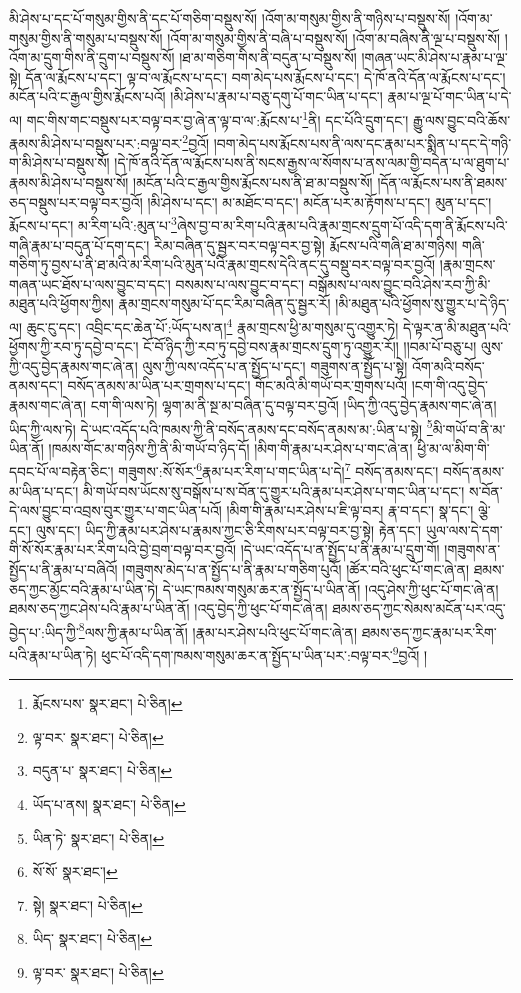 མི་ཤེས་པ་དང་པོ་གསུམ་གྱིས་ནི་དང་པོ་གཅིག་བསྡུས་སོ། །འོག་མ་གསུམ་གྱིས་ནི་གཉིས་པ་བསྡུས་སོ། །འོག་མ་གསུམ་གྱིས་ནི་གསུམ་པ་བསྡུས་སོ། །འོག་མ་གསུམ་གྱིས་ནི་བཞི་པ་བསྡུས་སོ། །འོག་མ་བཞིས་ནི་ལྔ་པ་བསྡུས་སོ། །འོག་མ་དྲུག་གིས་ནི་དྲུག་པ་བསྡུས་སོ། །ཐ་མ་གཅིག་གིས་ནི་བདུན་པ་བསྡུས་སོ། །གཞན་ཡང་མི་ཤེས་པ་རྣམ་པ་ལྔ་སྟེ། དོན་ལ་རྨོངས་པ་དང་། ལྟ་བ་ལ་རྨོངས་པ་དང་། བག་མེད་པས་རྨོངས་པ་དང་། དེ་ཁོ་ནའི་དོན་ལ་རྨོངས་པ་དང་། མངོན་པའི་ང་རྒྱལ་གྱིས་རྨོངས་པའོ། །མི་ཤེས་པ་རྣམ་པ་བཅུ་དགུ་པོ་གང་ཡིན་པ་དང་། རྣམ་པ་ལྔ་པོ་གང་ཡིན་པ་དེ་ལ། གང་གིས་གང་བསྡུས་པར་བལྟ་བར་བྱ་ཞེ་ན་ལྟ་བ་ལ་:རྨོངས་པ་\footnote{རྨོངས་པས་  སྣར་ཐང་།  པེ་ཅིན། }ནི། དང་པོའི་དྲུག་དང་། རྒྱུ་ལས་བྱུང་བའི་ཆོས་རྣམས་མི་ཤེས་པ་བསྡུས་པར་:བལྟ་བར་\footnote{ལྟ་བར་  སྣར་ཐང་།  པེ་ཅིན། }བྱའོ། །བག་མེད་པས་རྨོངས་པས་ནི་ལས་དང་རྣམ་པར་སྨིན་པ་དང་དེ་གཉི་ག་མི་ཤེས་པ་བསྡུས་སོ། །དེ་ཁོ་ནའི་དོན་ལ་རྨོངས་པས་ནི་སངས་རྒྱས་ལ་སོགས་པ་ནས་ལམ་གྱི་བདེན་པ་ལ་ཐུག་པ་རྣམས་མི་ཤེས་པ་བསྡུས་སོ། །མངོན་པའི་ང་རྒྱལ་གྱིས་རྨོངས་པས་ནི་ཐ་མ་བསྡུས་སོ། །དོན་ལ་རྨོངས་པས་ནི་ཐམས་ཅད་བསྡུས་པར་བལྟ་བར་བྱའོ། །མི་ཤེས་པ་དང་། མ་མཐོང་བ་དང་། མངོན་པར་མ་རྟོགས་པ་དང་། མུན་པ་དང་། རྨོངས་པ་དང་། མ་རིག་པའི་:མུན་པ་\footnote{བདུན་པ་  སྣར་ཐང་།  པེ་ཅིན། }ཞེས་བྱ་བ་མ་རིག་པའི་རྣམ་པའི་རྣམ་གྲངས་དྲུག་པོ་འདི་དག་ནི་རྨོངས་པའི་གཞི་རྣམ་པ་བདུན་པོ་དག་དང་། རིམ་བཞིན་དུ་སྦྱར་བར་བལྟ་བར་བྱ་སྟེ། རྨོངས་པའི་གཞི་ཐ་མ་གཉིས། གཞི་གཅིག་ཏུ་བྱས་པ་ནི་ཐ་མའི་མ་རིག་པའི་མུན་པའི་རྣམ་གྲངས་དེའི་ནང་དུ་བསྡུ་བར་བལྟ་བར་བྱའོ། །རྣམ་གྲངས་གཞན་ཡང་ཐོས་པ་ལས་བྱུང་བ་དང་། བསམས་པ་ལས་བྱུང་བ་དང་། བསྒོམས་པ་ལས་བྱུང་བའི་ཤེས་རབ་ཀྱི་མི་མཐུན་པའི་ཕྱོགས་ཀྱིས། རྣམ་གྲངས་གསུམ་པོ་དང་རིམ་བཞིན་དུ་སྦྱར་རོ། །མི་མཐུན་པའི་ཕྱོགས་སུ་གྱུར་པ་དེ་ཉིད་ལ། ཆུང་ངུ་དང་། འབྲིང་དང་ཆེན་པོ་:ཡོད་པས་ན།\footnote{ཡོད་པ་ནས།  སྣར་ཐང་།  པེ་ཅིན། } རྣམ་གྲངས་ཕྱི་མ་གསུམ་དུ་འགྱུར་ཏེ། དེ་ལྟར་ན་མི་མཐུན་པའི་ཕྱོགས་ཀྱི་རབ་ཏུ་དབྱེ་བ་དང་། ངོ་བོ་ཉིད་ཀྱི་རབ་ཏུ་དབྱེ་བས་རྣམ་གྲངས་དྲུག་ཏུ་འགྱུར་རོ།། །།བམ་པོ་བཅུ་པ། ལུས་ཀྱི་འདུ་བྱེད་རྣམས་གང་ཞེ་ན། ལུས་ཀྱི་ལས་འདོད་པ་ན་སྤྱོད་པ་དང་། གཟུགས་ན་སྤྱོད་པ་སྟེ། འོག་མའི་བསོད་ནམས་དང་། བསོད་ནམས་མ་ཡིན་པར་གྲགས་པ་དང་། གོང་མའི་མི་གཡོ་བར་གྲགས་པའོ། །ངག་གི་འདུ་བྱེད་རྣམས་གང་ཞེ་ན། ངག་གི་ལས་ཏེ། ལྷག་མ་ནི་སྔ་མ་བཞིན་དུ་བལྟ་བར་བྱའོ། །ཡིད་ཀྱི་འདུ་བྱེད་རྣམས་གང་ཞེ་ན། ཡིད་ཀྱི་ལས་ཏེ། དེ་ཡང་འདོད་པའི་ཁམས་ཀྱི་ནི་བསོད་ནམས་དང་བསོད་ནམས་མ་:ཡིན་པ་སྟེ། \footnote{ཡིན་ཏེ་  སྣར་ཐང་།  པེ་ཅིན། }མི་གཡོ་བ་ནི་མ་ཡིན་ནོ། །ཁམས་གོང་མ་གཉིས་ཀྱི་ནི་མི་གཡོ་བ་ཉིད་དོ། །མིག་གི་རྣམ་པར་ཤེས་པ་གང་ཞེ་ན། ཕྱི་མ་ལ་མིག་གི་དབང་པོ་ལ་བརྟེན་ཅིང་། གཟུགས་:སོ་སོར་\footnote{སོ་སོ་  སྣར་ཐང་། }རྣམ་པར་རིག་པ་གང་ཡིན་པ་དེ།\footnote{སྟེ།  སྣར་ཐང་།  པེ་ཅིན། } བསོད་ནམས་དང་། བསོད་ནམས་མ་ཡིན་པ་དང་། མི་གཡོ་བས་ཡོངས་སུ་བསྒོས་པ་ས་བོན་དུ་གྱུར་པའི་རྣམ་པར་ཤེས་པ་གང་ཡིན་པ་དང་། ས་བོན་དེ་ལས་བྱུང་བ་འབྲས་བུར་གྱུར་པ་གང་ཡིན་པའོ། །མིག་གི་རྣམ་པར་ཤེས་པ་ཇི་ལྟ་བར། རྣ་བ་དང་། སྣ་དང་། ལྕེ་དང་། ལུས་དང་། ཡིད་ཀྱི་རྣམ་པར་ཤེས་པ་རྣམས་ཀྱང་ཅི་རིགས་པར་བལྟ་བར་བྱ་སྟེ། རྟེན་དང་། ཡུལ་ལས་དེ་དག་གི་སོ་སོར་རྣམ་པར་རིག་པའི་བྱེ་བྲག་བལྟ་བར་བྱའོ། །དེ་ཡང་འདོད་པ་ན་སྤྱོད་པ་ནི་རྣམ་པ་དྲུག་གོ། །གཟུགས་ན་སྤྱོད་པ་ནི་རྣམ་པ་བཞིའོ། །གཟུགས་མེད་པ་ན་སྤྱོད་པ་ནི་རྣམ་པ་གཅིག་པུའོ། །ཚོར་བའི་ཕུང་པོ་གང་ཞེ་ན། ཐམས་ཅད་ཀྱང་མྱོང་བའི་རྣམ་པ་ཡིན་ཏེ། དེ་ཡང་ཁམས་གསུམ་ཆར་ན་སྤྱོད་པ་ཡིན་ནོ། །འདུ་ཤེས་ཀྱི་ཕུང་པོ་གང་ཞེ་ན། ཐམས་ཅད་ཀྱང་ཤེས་པའི་རྣམ་པ་ཡིན་ནོ། །འདུ་བྱེད་ཀྱི་ཕུང་པོ་གང་ཞེ་ན། ཐམས་ཅད་ཀྱང་སེམས་མངོན་པར་འདུ་བྱེད་པ་:ཡིད་ཀྱི་\footnote{ཡིད་  སྣར་ཐང་།  པེ་ཅིན། }ལས་ཀྱི་རྣམ་པ་ཡིན་ནོ། །རྣམ་པར་ཤེས་པའི་ཕུང་པོ་གང་ཞེ་ན། ཐམས་ཅད་ཀྱང་རྣམ་པར་རིག་པའི་རྣམ་པ་ཡིན་ཏེ། ཕུང་པོ་འདི་དག་ཁམས་གསུམ་ཆར་ན་སྤྱོད་པ་ཡིན་པར་:བལྟ་བར་\footnote{ལྟ་བར་  སྣར་ཐང་།  པེ་ཅིན། }བྱའོ། །
